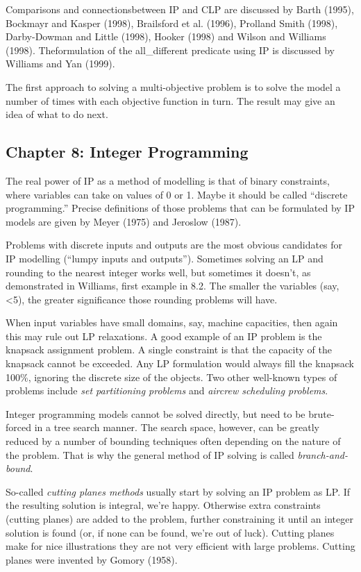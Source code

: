 \documentclass[13pt, letterpaper, twoside]{book}
\begin{document}
Comparisons and connectionsbetween IP and CLP are discussed by Barth (1995), Bockmayr and Kasper (1998), Brailsford
et al.
(1996), Prolland Smith (1998), Darby-Dowman and Little (1998), Hooker (1998) and Wilson and Williams (1998). Theformulation of the all\_different predicate using IP is discussed by Williams and Yan (1999).

The first approach to solving a multi-objective problem is to solve the model a number of times with each objective function in turn. The result may give an idea of what to do next.


\subsection{Chapter 8: Integer Programming}

The real power of IP as a method of modelling is that of binary constraints, where variables can take on values of 0 or 1. Maybe it should be called ``discrete programming.'' Precise definitions of those problems that can be formulated by IP models are given by Meyer (1975) and Jeroslow (1987). 

Problems with discrete inputs and outputs are the most obvious candidates for IP modelling (``lumpy inputs and outputs''). Sometimes solving an LP and rounding to the nearest integer works well, but sometimes it doesn't, as demonstrated in Williams, first example in 8.2. The smaller the variables (say, <5), the greater significance those rounding problems will have. 

When input variables have small domains, say, machine capacities, then again this may rule out LP relaxations. A good example of an IP problem is the knapsack assignment problem. A single constraint is that the capacity of the knapsack cannot be exceeded. Any LP formulation would always fill the knapsack 100\%, ignoring the discrete size of the objects. Two other well-known types of problems include \textit{set partitioning problems} and \textit{aircrew scheduling problems}. 

Integer programming models cannot be solved directly, but need to be brute-forced in a tree search manner. The search space, however, can be greatly reduced by a number of bounding techniques often depending on the nature of the problem. That is why the general method of IP solving is called \textit{branch-and-bound}.

So-called \textit{cutting planes methods} usually start by solving an IP problem as LP. If the resulting solution is integral, we're happy. Otherwise extra constraints (cutting planes) are added to the problem, further constraining it until an integer solution is found (or, if none can be found, we're out of luck). Cutting planes make for nice illustrations they are not very efficient with large problems. Cutting planes were invented by Gomory (1958).
\end{document}
